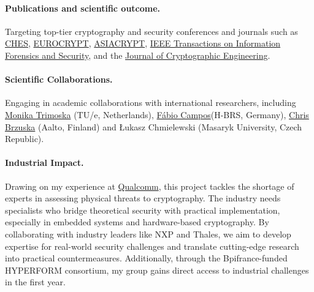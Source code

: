 \documentclass[11pt, a4paper]{article}
\begin{document}
\paragraph{Publications and scientific outcome.} Targeting top-tier cryptography and security conferences and journals such as 
\href{https://ches.iacr.org/index.php}{CHES}, \href{https://eurocrypt.iacr.org/}{EUROCRYPT}, 
\href{https://asiacrypt.iacr.org/}{ASIACRYPT}, 
\href{https://ieeexplore.ieee.org/xpl/RecentIssue.jsp?punumber=10206}{IEEE Transactions on Information Forensics and Security}, 
and the \href{https://link.springer.com/journal/13389}{Journal of Cryptographic Engineering}. 

\vspace{-0.5cm}
\paragraph{Scientific Collaborations.} Engaging in academic collaborations with international 
researchers, including \href{https://mtrimoska.com/}{Monika Trimoska} (TU/e, Netherlands),
\href{https://www.sopmac.de/index.html}{Fábio Campos}(H-BRS, Germany), \href{https://research.aalto.fi/en/persons/chris-brzuska}{Chris Brzuska} (Aalto, Finland) 
and Łukasz Chmielewski (Masaryk University, Czech Republic). 
\vspace{-0.5cm}


\paragraph{Industrial Impact.}
Drawing on my experience at 
\href{https://www.qualcomm.com/}{Qualcomm}, this project tackles 
the shortage of experts in assessing physical threats to 
cryptography. The industry needs specialists who bridge 
theoretical security with practical implementation, especially in 
embedded systems and hardware-based cryptography. By collaborating 
with industry leaders like NXP and Thales, we aim to develop 
expertise for real-world security challenges and translate 
cutting-edge research into practical countermeasures. Additionally, 
through the Bpifrance-funded HYPERFORM consortium, my group gains
direct access to industrial challenges in the first year.
\vspace{-0.5cm}
\end{document}
